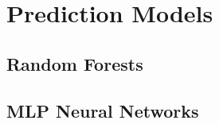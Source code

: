 \documentclass[a4paper,11pt]{article}
\begin{document}



\section{Prediction Models}

\subsection{Random Forests}

\subsection{MLP Neural Networks}












\end{document}

